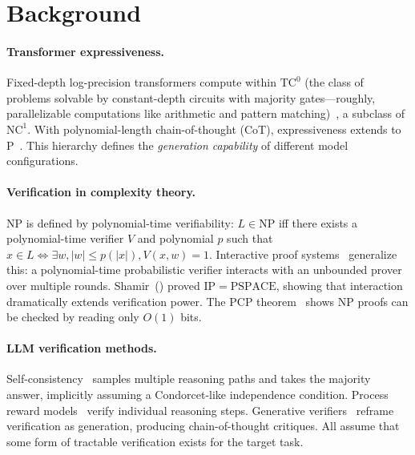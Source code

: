 \documentclass{article}
\theoremstyle{definition}
\theoremstyle{remark}
\newcommand{\TC}{\mathrm{TC}^0}
\newcommand{\NC}{\mathrm{NC}^1}
\newcommand{\PTIME}{\mathrm{P}}
\newcommand{\NP}{\mathrm{NP}}
\newcommand{\PSPACE}{\mathrm{PSPACE}}
\newcommand{\IP}{\mathrm{IP}}
\begin{document}
\section{Background}
\label{sec:background}

\paragraph{Transformer expressiveness.}
Fixed-depth log-precision transformers compute within $\TC$ (the class of problems solvable by constant-depth circuits with majority gates---roughly, parallelizable computations like arithmetic and pattern matching)~\citep{merrill2022saturated}, a subclass of $\NC$.
With polynomial-length chain-of-thought (CoT), expressiveness extends to $\PTIME$~\citep{merrill2024expressive,li2024chain}.
This hierarchy defines the \emph{generation capability} of different model configurations.

\paragraph{Verification in complexity theory.}
$\NP$ is defined by polynomial-time verifiability: $L \in \NP$ iff there exists a polynomial-time verifier $V$ and polynomial $p$ such that $x \in L \Leftrightarrow \exists w, |w| \leq p(|x|), V(x,w) = 1$.
Interactive proof systems~\citep{goldwasser1985knowledge,babai1985trading} generalize this: a polynomial-time probabilistic verifier interacts with an unbounded prover over multiple rounds.
Shamir~(\citeyear{shamir1992ip}) proved $\IP = \PSPACE$, showing that interaction dramatically extends verification power.
The PCP theorem~\citep{arora1998proof} shows $\NP$ proofs can be checked by reading only $O(1)$ bits.

\paragraph{LLM verification methods.}
Self-consistency~\citep{wang2023selfconsistency} samples multiple reasoning paths and takes the majority answer, implicitly assuming a Condorcet-like independence condition.
Process reward models~\citep{lightman2023lets} verify individual reasoning steps.
Generative verifiers~\citep{hosseini2024genrm} reframe verification as generation, producing chain-of-thought critiques.
All assume that some form of tractable verification exists for the target task.
\end{document}
